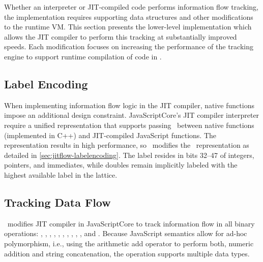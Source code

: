 Whether an interpreter or JIT-compiled code performs information flow tracking, the implementation requires supporting data structures and other modifications to the runtime VM.
This section presents the lower-level implementation which allows the JIT compiler to perform this tracking at substantially improved speeds.
Each modification focuses on increasing the performance of the tracking engine to support runtime compilation of code in \JitFlow.

\subsection{Label Encoding}

When implementing information flow logic in the JIT compiler, native functions impose an additional design constraint.
JavaScriptCore's JIT compiler interpreter require a unified representation that supports passing \jsvalues\ between native functions (implemented in C++) and JIT-compiled JavaScript functions.
The  representation results in high performance, so \JitFlow\ modifies the \JSValue\ representation as detailed in \autoref{sec:jitflow-labelencoding}.
The label resides in bits 32--47 of integers, pointers, and immediates, while doubles remain implicitly labeled with the highest available label in the lattice.

\subsection{Tracking Data Flow}\label{ch:implementation-sec:jitflow-tracking-data-flow}

\JitFlow\ modifies JIT compiler in JavaScriptCore to track information flow in all binary operations:  , , , , , , , , , , and .
Because JavaScript semantics allow for ad-hoc polymorphism, i.e., using the arithmetic add operator to perform both, numeric addition and string concatenation, the  operation supports multiple data types.

